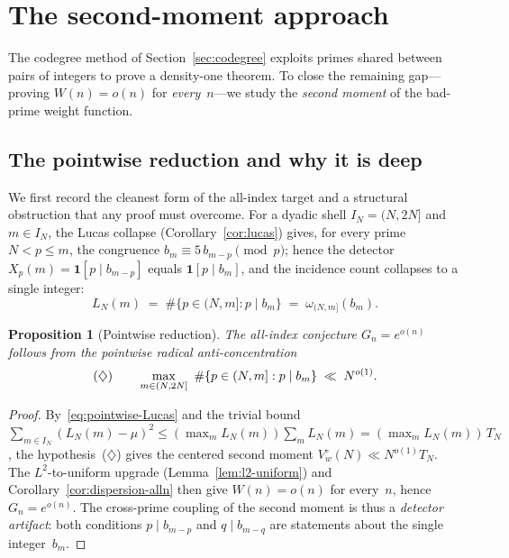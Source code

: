 \documentclass[11pt]{article}
\newtheorem{proposition}[theorem]{Proposition}
\theoremstyle{definition}
\theoremstyle{remark}
\begin{document}
\section{The second-moment approach}\label{sec:second-moment}

The codegree method of Section~\ref{sec:codegree} exploits
primes shared between pairs of integers to prove a density-one
theorem. To close the remaining gap---proving
$W(n) = o(n)$ for \emph{every}~$n$---we study the
\emph{second moment} of the bad-prime weight function.

\subsection{The pointwise reduction and why it is deep}
\label{ssec:pointwise-reduction}

We first record the cleanest form of the all-index
target and a structural obstruction that any proof
must overcome.  For a dyadic shell $I_N = (N, 2N]$
and $m \in I_N$, the Lucas collapse
(Corollary~\ref{cor:lucas}) gives, for every prime
$N < p \le m$, the congruence
$b_m \equiv 5\,b_{m-p} \pmod p$; hence the detector
$X_p(m) = \mathbf 1[p \mid b_{m-p}]$ equals
$\mathbf 1[p \mid b_m]$, and the incidence count
collapses to a single integer:
\begin{equation}\label{eq:pointwise-Lucas}
  L_N(m) \;=\; \#\{p \in (N, m] : p \mid b_m\}
  \;=\; \omega_{(N,m]}(b_m).
\end{equation}

\begin{proposition}[Pointwise reduction]
\label{prop:pointwise-reduction}
The all-index conjecture $G_n = e^{o(n)}$ follows from
the pointwise radical anti-concentration
\begin{equation}\label{eq:pointwise-target}
  \textup{(\ensuremath{\diamondsuit})}\qquad
  \max_{m \in (N, 2N]}\ \#\{p \in (N, m] : p \mid b_m\}
  \;\ll\; N^{o(1)}.
\end{equation}
\end{proposition}

\begin{proof}
By~\eqref{eq:pointwise-Lucas} and the trivial bound
$\sum_{m \in I_N}(L_N(m) - \mu)^2
\le (\max_m L_N(m)) \sum_m L_N(m)
= (\max_m L_N(m))\,T_N$, the hypothesis~(\ensuremath{\diamondsuit})
gives the centered second moment
$V^\circ_w(N) \ll N^{o(1)} T_N$.
The $L^2$-to-uniform upgrade
(Lemma~\ref{lem:l2-uniform}) and
Corollary~\ref{cor:dispersion-alln} then give
$W(n) = o(n)$ for every~$n$, hence
$G_n = e^{o(n)}$.
The cross-prime coupling of the second moment is thus a
\emph{detector artifact}: both conditions $p \mid b_{m-p}$
and $q \mid b_{m-q}$ are statements about the single
integer~$b_m$.
\end{proof}
\end{document}
